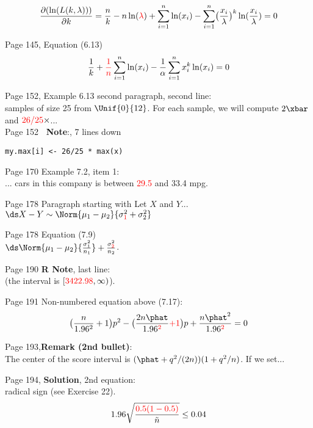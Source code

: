 \documentclass[11pt]{article}
\begin{document}
\[
  \frac{\partial(\ln(L(k,\lambda)))}{\partial k}
  = \frac{n}{k} - n\ln({\color{red}{\lambda}}) +\sum_{i=1}^n \ln(x_i)-\sum_{i=1}^n
     \bigl(\frac{x_i}{\lambda}\bigr)^k\ln(\frac{x_i}{\lambda})=0
\]


\bigskip
Page 145, Equation (6.13)%
\[
\frac{1}{k}+{\color{red}{\frac{1}{n}}}\sum_{i=1}^n \ln(x_i) - \frac{1}{\alpha}\sum_{i=1}^n x_i^k\ln(x_i)=0
\]


Page 152, Example 6.13 second paragraph, second line:\\
 samples of size 25 from $\Unif{0}{12}$. For each sample, we will compute
 $2\xbar$ and $\textcolor{red}{26/25}\times $...\\

Page 152 {\bf \R~Note}:, 7 lines down
\begin{verbatim}
my.max[i] <- 26/25 * max(x)
\end{verbatim}


\bigskip
Page 170 Example 7.2, item 1:\\
... cars in this company is between \textcolor{red}{29.5} and 33.4 mpg.

Page 178 Paragraph starting with Let $X$ and $Y$...\\
$\ds X-Y \sim \Norm{\mu_1-\mu_2}{\sigma_{\textcolor{red}{1}}^2 + \sigma_2^2}$

Page 178 Equation (7.9)\\
$\ds \Norm{\mu_1-\mu_2}{\frac{\sigma_1^2}{n_1}}+\frac{\sigma_{\textcolor{red}{2}}^2}{n_2}$.

\bigskip
Page 190 {\bf R Note}, last line:\\
(the interval is $[\textcolor{red}{3422.98}, \infty)$).


\bigskip%
Page 191 Non-numbered equation above (7.17):
\[
\bigl(\frac{n}{1.96^2}+1\bigr)p^2 - \bigl(\frac{2n\phat}{1.96^{\textcolor{red}{2}}}
\textcolor{red}{+ 1}\bigr)p + \frac{n\phat^2}{1.96^{\textcolor{red}{2}}}=0
\]


\bigskip
Page 193,{\bf Remark (2nd bullet)}: \\
The center of the score interval is \textcolor{red}{$(\phat + q^2/(2n))(1+q^2/n)$}. If we set...

\bigskip
Page 194, {\bf Solution}, 2nd equation:\\ %
radical sign (see Exercise 22).
\[
1.96\sqrt{\frac{{\color{red}{0.5(1-0.5)}}}{\tilde{n}}}\le 0.04
\]
\end{document}
